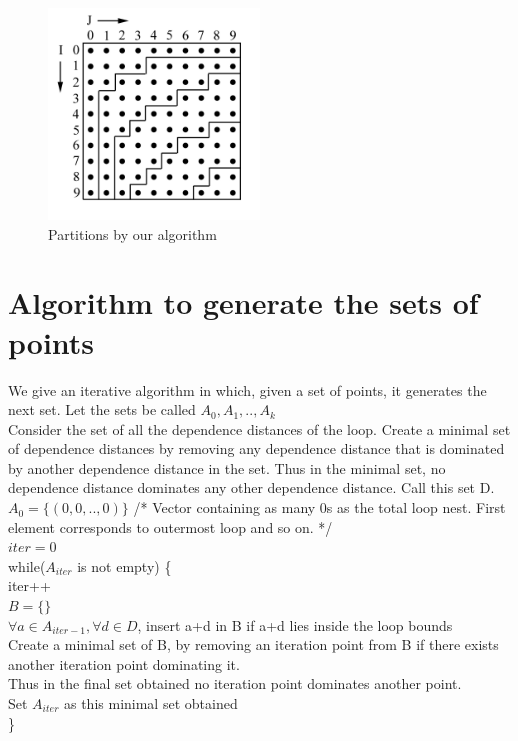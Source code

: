 \begin{figure}
\caption{Partitions by our algorithm}
\label{fig:partition_eg}
\centering \includegraphics[width=0.5\textwidth]{Figures/fig2.jpg}
\end{figure}


\section{Algorithm to generate the sets of points}

We give an iterative algorithm in which, given a set of points, it generates the next set.
Let the sets be called $A_0, A_1, .. ,A_k$ \\

Consider the set of all the dependence distances of the loop. 
Create a minimal set of dependence distances by removing any dependence distance that is dominated by another dependence distance in the set.
Thus in the minimal set, no dependence distance dominates any other dependence distance.
Call this set D. \\

\noindent
$A_0 = \{(0,0,..,0)\}$ /* Vector containing as many 0s as the total loop nest. First element corresponds to outermost loop and so on. */ \\
$iter = 0$ \\
while($A_{iter}$ is not empty) \{ \\
\indent	iter++ \\
\indent	$B = \{\}$ \\
\indent	$ \forall a \in A_{iter-1}, \forall d \in D$, insert a+d in B if a+d lies inside the loop bounds\\
\indent	Create a minimal set of B, by removing an iteration point from B if there exists another iteration point dominating it.\\
\indent	Thus in the final set obtained no iteration point dominates another point.\\
\indent	Set $A_{iter}$ as this minimal set obtained\\
\} \\

